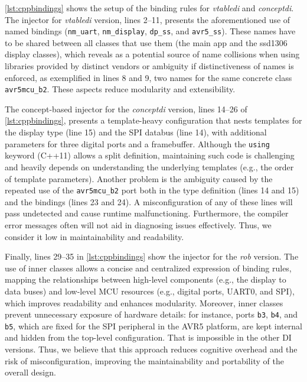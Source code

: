 \documentclass[10pt,sigplan,screen,anonymous]{acmart}
\begin{document}
\autoref{lst:cppbindings} shows the setup of the binding rules for \emph{vtabledi} and \emph{conceptdi}. The injector for \emph{vtabledi} version, lines 2--11, presents the aforementioned use of named bindings ({\tt nm\_uart}, {\tt nm\_display}, {\tt dp\_ss}, and {\tt avr5\_ss}). These names have to be shared between all classes that use them (the main app and the ssd1306 display classes), which reveals as a potential source of name collisions when using libraries provided by distinct vendors or ambiguity if distinctiveness of names is enforced, as exemplified in lines 8 and 9, two names for the same concrete class {\tt avr5mcu\_b2}. These aspects reduce modularity and extensibility.


The concept-based injector for the \emph{conceptdi} version, lines 14--26 of \autoref{lst:cppbindings}, presents a template-heavy configuration that nests templates for the display type (line 15) and the SPI databus (line 14), with additional parameters for three digital ports and a framebuffer. Although the {\tt using} keyword (C++11) allows a split definition, maintaining such code is challenging and heavily depends on understanding the underlying templates (e.g., the order of template parameters). Another problem is the ambiguity caused by the repeated use of the {\tt avr5mcu\_b2} port both in the type definition (lines 14 and 15) and the bindings (lines 23 and 24). A misconfiguration of any of these lines will pass undetected and cause runtime malfunctioning. Furthermore, the compiler error messages often will not aid in diagnosing issues effectively. Thus, we consider it low in maintainability and readability.

Finally, lines 29--35 in \autoref{lst:cppbindings} show the injector for the \emph{rob} version. The use of inner classes allows a concise and centralized expression of binding rules, mapping the relationships between high-level components (e.g., the display to data buses) and low-level MCU resources (e.g., digital ports, UART0, and SPI), which improves readability and enhances modularity. Moreover, inner classes prevent unnecessary exposure of hardware details: for instance, ports {\tt b3}, {\tt b4}, and {\tt b5}, which are fixed for the SPI peripheral in the AVR5 platform, are kept internal and hidden from the top-level configuration. That is impossible in the other DI versions. Thus, we believe that this approach reduces cognitive overhead and the risk of misconfiguration, improving the maintainability and portability of the overall design.
\end{document}

